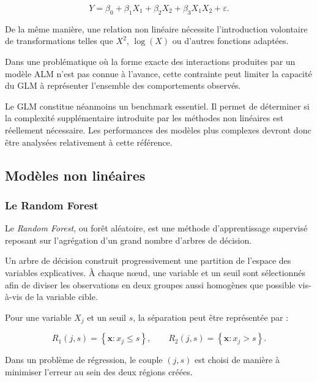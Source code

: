 \begin{equation}
    Y
    =
    \beta_0
    +
    \beta_1X_1
    +
    \beta_2X_2
    +
    \beta_3 X_1X_2
    +
    \varepsilon.
\end{equation}

De la même manière, une relation non linéaire nécessite l'introduction volontaire de transformations telles que $X^2$, $\log(X)$ ou d'autres fonctions adaptées.

Dans une problématique où la forme exacte des interactions produites par un modèle ALM n'est pas connue à l'avance, cette contrainte peut limiter la capacité du GLM à représenter l'ensemble des comportements observés.

Le GLM constitue néanmoins un benchmark essentiel. Il permet de déterminer si la complexité supplémentaire introduite par les méthodes non linéaires est réellement nécessaire. Les performances des modèles plus complexes devront donc être analysées relativement à cette référence.


\subsection{Modèles non linéaires}

\subsubsection{Le Random Forest}

Le \textit{Random Forest}, ou forêt aléatoire, est une méthode d'apprentissage supervisé reposant sur l'agrégation d'un grand nombre d'arbres de décision.

Un arbre de décision construit progressivement une partition de l'espace des variables explicatives. À chaque nœud, une variable et un seuil sont sélectionnés afin de diviser les observations en deux groupes aussi homogènes que possible vis-à-vis de la variable cible.

Pour une variable $X_j$ et un seuil $s$, la séparation peut être représentée par :

\begin{equation}
    R_1(j,s)
    =
    \left\{
    \mathbf{x}:x_j \leq s
    \right\},
    \qquad
    R_2(j,s)
    =
    \left\{
    \mathbf{x}:x_j > s
    \right\}.
\end{equation}

Dans un problème de régression, le couple $(j,s)$ est choisi de manière à minimiser l'erreur au sein des deux régions créées.

